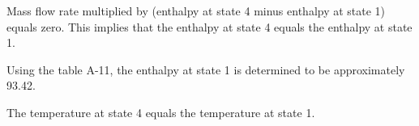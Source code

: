 Mass flow rate multiplied by (enthalpy at state 4 minus enthalpy at state 1) equals zero.  
This implies that the enthalpy at state 4 equals the enthalpy at state 1.  

Using the table A-11, the enthalpy at state 1 is determined to be approximately 93.42.  

The temperature at state 4 equals the temperature at state 1.